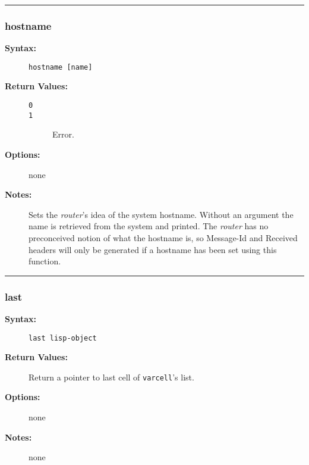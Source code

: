 \hrule
\subsubsection{hostname}

\begin{description}
\item[{\bf Syntax:}] \mbox{}

{\tt hostname [name]}

\item[{\bf Return Values:}] \mbox{}

\begin{description}
\item[{\tt 0}] \mbox{}



\item[{\tt 1}] \mbox{}

Error.

\end{description}


\item[{\bf Options:}] \mbox{}

none  

\item[{\bf Notes:}] \mbox{}

Sets the {\em router\/}'s idea of the
system hostname. Without an argument the name is retrieved from
the system and printed. The {\em router\/} has no preconceived 
notion of what the hostname is, so Message-Id and Received headers 
will only be generated if a hostname has been set using this function.

\end{description}


\hrule
\subsubsection{last}

\begin{description}
\item[{\bf Syntax:}] \mbox{}

{\tt last lisp-object}

\item[{\bf Return Values:}] \mbox{}

Return a pointer to last cell of 
{\tt varcell}'s list.

\item[{\bf Options:}] \mbox{}

none  

\item[{\bf Notes:}] \mbox{}

none

\end{description}


